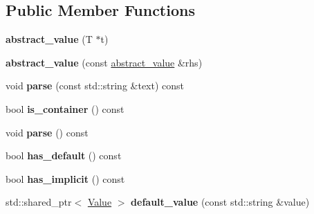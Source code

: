 \subsection*{Public Member Functions}
\begin{DoxyCompactItemize}
\item 
{\bfseries abstract\+\_\+value} (T $\ast$t)\hypertarget{classcxxopts_1_1values_1_1abstract__value_a578211778e2d3a3eb5c9f9a57b5b9cd1}{}\label{classcxxopts_1_1values_1_1abstract__value_a578211778e2d3a3eb5c9f9a57b5b9cd1}

\item 
{\bfseries abstract\+\_\+value} (const \hyperlink{classcxxopts_1_1values_1_1abstract__value}{abstract\+\_\+value} \&rhs)\hypertarget{classcxxopts_1_1values_1_1abstract__value_a512fb323456e370b1f7b784d57b55c25}{}\label{classcxxopts_1_1values_1_1abstract__value_a512fb323456e370b1f7b784d57b55c25}

\item 
void {\bfseries parse} (const std\+::string \&text) const \hypertarget{classcxxopts_1_1values_1_1abstract__value_a6944702e88f115ef78c94756da1eef12}{}\label{classcxxopts_1_1values_1_1abstract__value_a6944702e88f115ef78c94756da1eef12}

\item 
bool {\bfseries is\+\_\+container} () const \hypertarget{classcxxopts_1_1values_1_1abstract__value_a5710a789dac4ca38756923b6d729af90}{}\label{classcxxopts_1_1values_1_1abstract__value_a5710a789dac4ca38756923b6d729af90}

\item 
void {\bfseries parse} () const \hypertarget{classcxxopts_1_1values_1_1abstract__value_ae54c9777d3548eef0aa9243956308b43}{}\label{classcxxopts_1_1values_1_1abstract__value_ae54c9777d3548eef0aa9243956308b43}

\item 
bool {\bfseries has\+\_\+default} () const \hypertarget{classcxxopts_1_1values_1_1abstract__value_a2b60d2e4e67220de5e690c15e649b291}{}\label{classcxxopts_1_1values_1_1abstract__value_a2b60d2e4e67220de5e690c15e649b291}

\item 
bool {\bfseries has\+\_\+implicit} () const \hypertarget{classcxxopts_1_1values_1_1abstract__value_aea84f1d63e35685948e842313455cabf}{}\label{classcxxopts_1_1values_1_1abstract__value_aea84f1d63e35685948e842313455cabf}

\item 
std\+::shared\+\_\+ptr$<$ \hyperlink{classcxxopts_1_1Value}{Value} $>$ {\bfseries default\+\_\+value} (const std\+::string \&value)\hypertarget{classcxxopts_1_1values_1_1abstract__value_a63ad0dbf9f18fc7fc8553030a03cfc88}{}\label{classcxxopts_1_1values_1_1abstract__value_a63ad0dbf9f18fc7fc8553030a03cfc88}


\end{DoxyCompactItemize}
